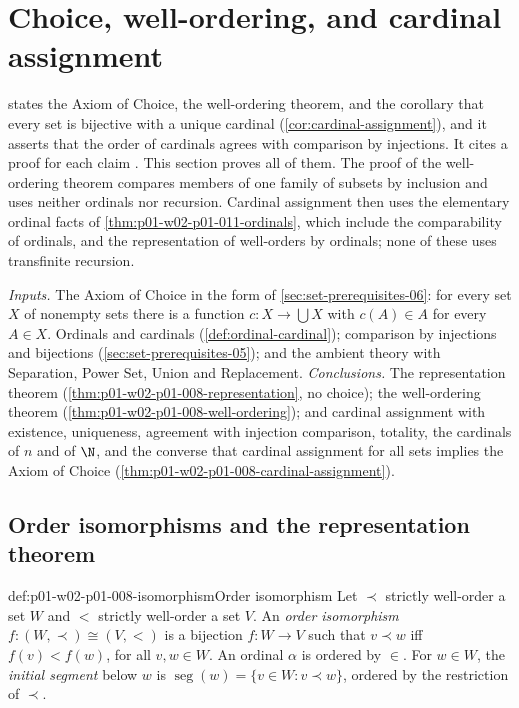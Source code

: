 \section{Choice, well-ordering, and cardinal assignment}
\label{sec:p01-w02-p01-008-choice}

 states the Axiom of Choice, the
well-ordering theorem, and the corollary that every set is bijective with a
unique cardinal (\cref{cor:cardinal-assignment}), and it asserts that the
order of cardinals agrees with comparison by injections. It cites a proof
for each claim \cite[ch.~``Sets, Relations, Functions, and Cardinality'',
sec.~``Choice principles used later'', definition ``Axiom of Choice'',
theorem ``Well-ordering theorem'', corollary ``Cardinal
assignment'']{FrozenFormalLogicOrdersChoice}. This section proves all of
them. The proof of the well-ordering theorem compares members of one family
of subsets by inclusion and uses neither ordinals nor recursion. Cardinal
assignment then uses the elementary ordinal facts of
\cref{thm:p01-w02-p01-011-ordinals}, which include the comparability of
ordinals, and the representation of well-orders by ordinals; none of these
uses transfinite recursion.

\emph{Inputs.} The Axiom of Choice in the form of
\cref{sec:set-prerequisites-06}: for every set \(X\) of nonempty sets there
is a function \(c:X\to\bigcup X\) with \(c(A)\in A\) for every \(A\in X\).
Ordinals and cardinals (\cref{def:ordinal-cardinal}); comparison by
injections and bijections (\cref{sec:set-prerequisites-05}); and the ambient
theory with Separation,
Power Set, Union and Replacement. \emph{Conclusions.} The representation
theorem (\cref{thm:p01-w02-p01-008-representation}, no choice); the
well-ordering theorem (\cref{thm:p01-w02-p01-008-well-ordering}); and
cardinal assignment with existence, uniqueness, agreement with injection
comparison, totality, the cardinals of \(n\) and of \(\N\), and the
converse that cardinal assignment for all sets implies the Axiom of Choice
(\cref{thm:p01-w02-p01-008-cardinal-assignment}).

\subsection{Order isomorphisms and the representation theorem}
\label{sec:p01-w02-p01-008-representation}

\begin{hbdefinition}{def:p01-w02-p01-008-isomorphism}{Order isomorphism}
Let \(\prec\) strictly well-order a set \(W\) and \(<\) strictly well-order
a set \(V\). An \emph{order isomorphism} \(f:(W,\prec)\cong(V,<)\) is a
bijection \(f:W\to V\) such that \(v\prec w\) iff \(f(v)<f(w)\), for all
\(v,w\in W\). An ordinal \(\alpha\) is ordered by \(\in\). For \(w\in W\),
the \emph{initial segment} below \(w\) is
\(\operatorname{seg}(w)=\{v\in W:v\prec w\}\), ordered by the restriction of
\(\prec\).
\end{hbdefinition}

